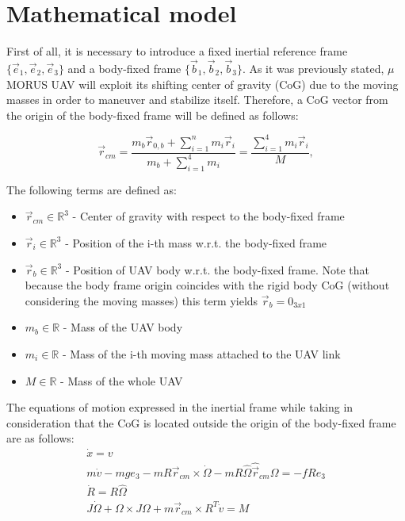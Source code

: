 \section{Mathematical model}

First of all, it is necessary to introduce a fixed inertial reference frame $\{ \vec{e}_1, \vec{e}_2, \vec{e}_3  \}$ and a body-fixed frame $ \{ \vec{b}_1, \vec{b}_2, \vec{b}_3 \}$. As it was previously stated, $\mu$MORUS UAV will exploit its shifting center of gravity (CoG) due to the moving masses in order to maneuver and stabilize itself. Therefore, a CoG vector from the origin of the body-fixed frame will be defined as follows:

\begin{equation}
	\vec{r}_{cm} = \frac{m_{b}\vec{r}_{0,b} + \sum_{i=1}^n m_{i}\vec{r}_{i}}{m_{b} + \sum_{i=1}^4 m_{i}} = \frac{\sum_{i=1}^4 m_{i}\vec{r}_{i}}{M},
	\label{equ:cog}
\end{equation}

The following terms are defined as: 
\begin{itemize}
	\item $\vec{r}_{cm} \in \mathbb{R}^3$ - Center of gravity with respect to the body-fixed frame
	
	\item $\vec{r}_{i} \in \mathbb{R}^3$ - Position of the i-th mass w.r.t. the body-fixed frame
	
	\item $\vec{r}_{b} \in \mathbb{R}^3$ - Position of UAV body w.r.t. the body-fixed frame. Note that because the body frame origin coincides with the rigid body CoG (without considering the moving masses) this term yields $\vec{r}_b = 0_{3x1}$
	
	\item $m_b \in \mathbb{R}$ - Mass of the UAV body 
	
	\item $m_i \in \mathbb{R}$ - Mass of the i-th moving mass attached to the UAV link
	
	\item $M \in \mathbb{R}$ - Mass of the whole UAV
\end{itemize}

The equations of motion expressed in the inertial frame while taking in consideration that the CoG is located outside the origin of the body-fixed frame are as follows: 
\begin{gather}
	\dot{x} = v \\
	m\dot{v} - mge_3 - mR \vec{r}_{cm} \times \dot{\Omega} - mR\hat{\Omega}\hat{\vec{r}}_{cm}\Omega = -fRe_3 \\
	\dot{R} = R\hat{\Omega} \\
	J \dot{\Omega} + \Omega \times J \Omega + m \vec{r}_{cm} \times R^T \dot{v} = M
\end{gather}

